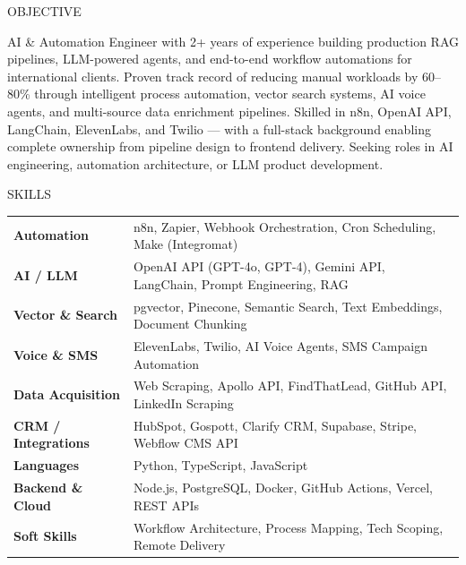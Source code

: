 \documentclass{resume}
\begin{document}

\begin{rSection}{OBJECTIVE}

{AI \& Automation Engineer with 2+ years of experience building production RAG pipelines, LLM-powered agents, and end-to-end workflow automations for international clients. Proven track record of reducing manual workloads by 60--80\% through intelligent process automation, vector search systems, AI voice agents, and multi-source data enrichment pipelines. Skilled in n8n, OpenAI API, LangChain, ElevenLabs, and Twilio — with a full-stack background enabling complete ownership from pipeline design to frontend delivery. Seeking roles in AI engineering, automation architecture, or LLM product development.}

\end{rSection}


\begin{rSection}{SKILLS}

\begin{tabular}{ @{} >{\bfseries}l @{\hspace{6ex}} l }
Automation         & n8n, Zapier, Webhook Orchestration, Cron Scheduling, Make (Integromat) \\
AI / LLM           & OpenAI API (GPT-4o, GPT-4), Gemini API, LangChain, Prompt Engineering, RAG \\
Vector \& Search   & pgvector, Pinecone, Semantic Search, Text Embeddings, Document Chunking \\
Voice \& SMS       & ElevenLabs, Twilio, AI Voice Agents, SMS Campaign Automation \\
Data Acquisition   & Web Scraping, Apollo API, FindThatLead, GitHub API, LinkedIn Scraping \\
CRM / Integrations & HubSpot, Gospott, Clarify CRM, Supabase, Stripe, Webflow CMS API \\
Languages          & Python, TypeScript, JavaScript \\
Backend \& Cloud   & Node.js, PostgreSQL, Docker, GitHub Actions, Vercel, REST APIs \\
Soft Skills        & Workflow Architecture, Process Mapping, Tech Scoping, Remote Delivery \\
\end{tabular}\\

\end{rSection}
\end{document}
